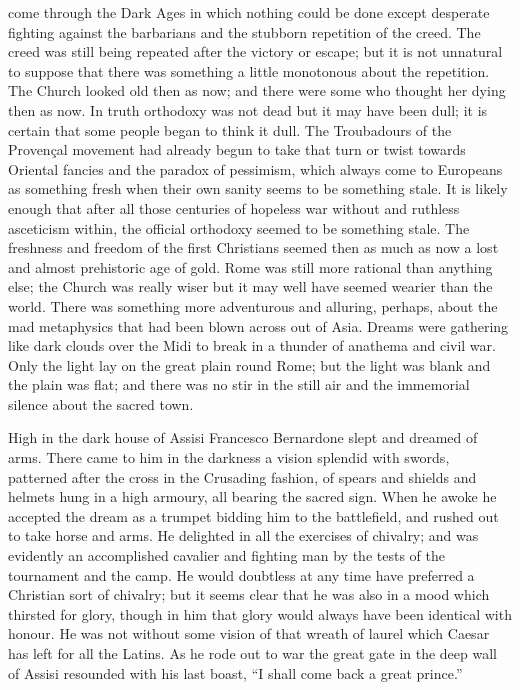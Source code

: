 \documentclass{book}
\begin{document}
come through the Dark Ages in which nothing could be done except desperate fighting against the barbarians and the stubborn repetition of the creed. The creed was still being repeated after the victory or escape; but it is not unnatural to suppose that there was something a little monotonous about the repetition. The Church looked old then as now; and there were some who thought her dying then as now. In truth orthodoxy was not dead but it may have been dull; it is certain that some people began to think it dull. The Troubadours of the Provençal movement had already begun to take that turn or twist towards Oriental fancies and the paradox of pessimism, which always come to Europeans as something fresh when their own sanity seems to be something stale. It is likely enough that after all those centuries of hopeless war without and ruthless asceticism within, the official orthodoxy seemed to be something stale. The freshness and freedom of the first Christians seemed then as much as now a lost and almost prehistoric age of gold. Rome was still more rational than anything else; the Church was really wiser but it may well have seemed wearier than the world. There was something more adventurous and alluring, perhaps, about the mad metaphysics that had been blown across out of Asia. Dreams were gathering like dark clouds over the Midi to break in a thunder of anathema and civil war. Only the light lay on the great plain round Rome; but the light was blank and the plain was flat; and there was no stir in the still air and the immemorial silence about the sacred town.

High in the dark house of Assisi Francesco Bernardone slept and dreamed of arms. There came to him in the darkness a vision splendid with swords, patterned after the cross in the Crusading fashion, of spears and shields and helmets hung in a high armoury, all bearing the sacred sign. When he awoke he accepted the dream as a trumpet bidding him to the battlefield, and rushed out to take horse and arms. He delighted in all the exercises of chivalry; and was evidently an accomplished cavalier and fighting man by the tests of the tournament and the camp. He would doubtless at any time have preferred a Christian sort of chivalry; but it seems clear that he was also in a mood which thirsted for glory, though in him that glory would always have been identical with honour. He was not without some vision of that wreath of laurel which Caesar has left for all the Latins. As he rode out to war the great gate in the deep wall of Assisi resounded with his last boast, “I shall come back a great prince.”
\end{document}

